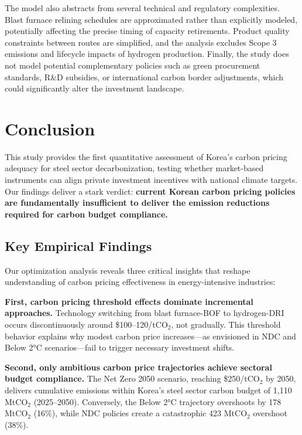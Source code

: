 \documentclass[preprint,1p,authoryear]{elsarticle}
\begin{document}
The model also abstracts from several technical and regulatory complexities. Blast furnace relining schedules are approximated rather than explicitly modeled, potentially affecting the precise timing of capacity retirements. Product quality constraints between routes are simplified, and the analysis excludes Scope 3 emissions and lifecycle impacts of hydrogen production. Finally, the study does not model potential complementary policies such as green procurement standards, R\&D subsidies, or international carbon border adjustments, which could significantly alter the investment landscape.

\section{Conclusion}

This study provides the first quantitative assessment of Korea's carbon pricing adequacy for steel sector decarbonization, testing whether market-based instruments can align private investment incentives with national climate targets. Our findings deliver a stark verdict: \textbf{current Korean carbon pricing policies are fundamentally insufficient to deliver the emission reductions required for carbon budget compliance.}

\subsection{Key Empirical Findings}

Our optimization analysis reveals three critical insights that reshape understanding of carbon pricing effectiveness in energy-intensive industries:

\textbf{First, carbon pricing threshold effects dominate incremental approaches.} Technology switching from blast furnace-BOF to hydrogen-DRI occurs discontinuously around \$100--120/tCO$_2$, not gradually. This threshold behavior explains why modest carbon price increases—as envisioned in NDC and Below 2°C scenarios—fail to trigger necessary investment shifts.

\textbf{Second, only ambitious carbon price trajectories achieve sectoral budget compliance.} The Net Zero 2050 scenario, reaching \$250/tCO$_2$ by 2050, delivers cumulative emissions within Korea's steel sector carbon budget of 1,110 MtCO$_2$ (2025--2050). Conversely, the Below 2°C trajectory overshoots by 178 MtCO$_2$ (16\%), while NDC policies create a catastrophic 423 MtCO$_2$ overshoot (38\%).
\end{document}
